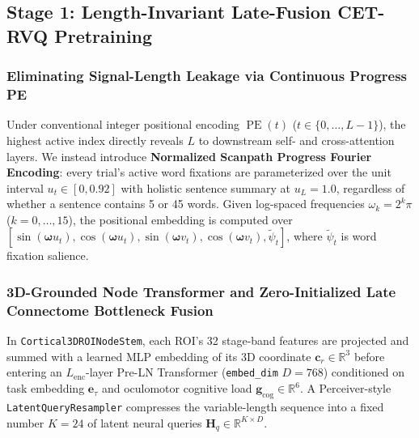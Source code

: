 \documentclass[journal]{IEEEtran}
\begin{document}
\subsection{Stage 1: Length-Invariant Late-Fusion CET-RVQ Pretraining}

\subsubsection{Eliminating Signal-Length Leakage via Continuous Progress PE}
Under conventional integer positional encoding $\operatorname{PE}(t)$ ($t \in \{0,\dots,L-1\}$), the highest active index directly reveals $L$ to downstream self- and cross-attention layers. We instead introduce \textbf{Normalized Scanpath Progress Fourier Encoding}: every trial's active word fixations are parameterized over the unit interval $u_t \in [0, 0.92]$ with holistic sentence summary at $u_L = 1.0$, regardless of whether a sentence contains 5 or 45 words. Given log-spaced frequencies $\omega_k = 2^k \pi$ ($k=0,\dots,15$), the positional embedding is computed over $[\sin(\boldsymbol{\omega} u_t), \cos(\boldsymbol{\omega} u_t), \sin(\boldsymbol{\omega} v_t), \cos(\boldsymbol{\omega} v_t), \tilde{\psi}_t]$, where $\tilde{\psi}_t$ is word fixation salience.

\subsubsection{3D-Grounded Node Transformer and Zero-Initialized Late Connectome Bottleneck Fusion}
In \texttt{Cortical3DROINodeStem}, each ROI's 32 stage-band features are projected and summed with a learned MLP embedding of its 3D coordinate $\mathbf{c}_{r} \in \mathbb{R}^3$ before entering an $L_{\text{enc}}$-layer Pre-LN Transformer (\texttt{embed\_dim} $D=768$) conditioned on task embedding $\mathbf{e}_{\tau}$ and oculomotor cognitive load $\mathbf{g}_{\text{cog}} \in \mathbb{R}^6$. A Perceiver-style \texttt{LatentQueryResampler} compresses the variable-length sequence into a fixed number $K=24$ of latent neural queries $\mathbf{H}_q \in \mathbb{R}^{K \times D}$.
\end{document}
